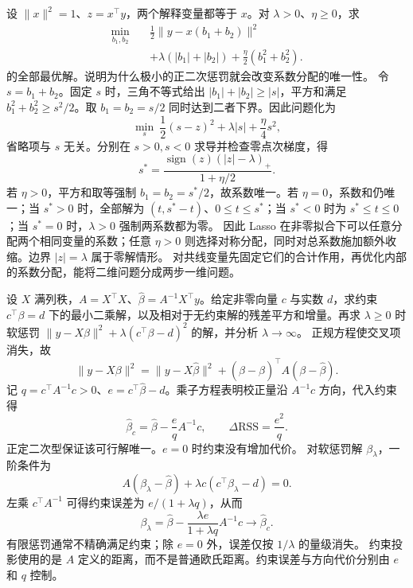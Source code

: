 设 $\|x\|^2=1$、$z=x^\top y$，两个解释变量都等于 $x$。对 $\lambda>0$、$\eta\ge0$，求
\[
 \begin{aligned}
 \min_{b_1,b_2}\quad&\frac12\|y-x(b_1+b_2)\|^2\\
 &+\lambda(|b_1|+|b_2|)+\frac\eta2(b_1^2+b_2^2).
 \end{aligned}
\]
的全部最优解。说明为什么极小的正二次惩罚就会改变系数分配的唯一性。
\solution 令 $s=b_1+b_2$。固定 $s$ 时，三角不等式给出 $|b_1|+|b_2|\ge|s|$，平方和满足 $b_1^2+b_2^2\ge s^2/2$。取 $b_1=b_2=s/2$ 同时达到二者下界。因此问题化为
\[
 \min_s\ \frac12(s-z)^2+\lambda|s|+\frac\eta4s^2,
\]
省略项与 $s$ 无关。分别在 $s>0,s<0$ 求导并检查零点次梯度，得
\[
 s^*=\frac{\operatorname{sign}(z)(|z|-\lambda)_+}{1+\eta/2}.
\]
若 $\eta>0$，平方和取等强制 $b_1=b_2=s^*/2$，故系数唯一。若 $\eta=0$，系数和仍唯一；当 $s^*>0$ 时，全部解为 $(t,s^*-t)$、$0\le t\le s^*$；当 $s^*<0$ 时为 $s^*\le t\le0$；当 $s^*=0$ 时，$\lambda>0$ 强制两系数都为零。
因此 Lasso 在非零拟合下可以任意分配两个相同变量的系数；任意 $\eta>0$ 则选择对称分配，同时对总系数施加额外收缩。边界 $|z|=\lambda$ 属于零解情形。
\insight 对共线变量先固定它们的合计作用，再优化内部的系数分配，能将二维问题分成两步一维问题。

设 $X$ 满列秩，$A=X^\top X$、$\widehat\beta=A^{-1}X^\top y$。给定非零向量 $c$ 与实数 $d$，求约束 $c^\top\beta=d$ 下的最小二乘解，以及相对于无约束解的残差平方和增量。再求 $\lambda\ge0$ 时软惩罚 $\|y-X\beta\|^2+\lambda(c^\top\beta-d)^2$ 的解，并分析 $\lambda\to\infty$。
\solution 正规方程使交叉项消失，故
\[
 \|y-X\beta\|^2=\|y-X\widehat\beta\|^2
 +(\beta-\widehat\beta)^\top A(\beta-\widehat\beta).
\]
记 $q=c^\top A^{-1}c>0$、$e=c^\top\widehat\beta-d$。乘子方程表明校正量沿 $A^{-1}c$ 方向，代入约束得
\[
 \boxed{\widehat\beta_c=\widehat\beta-\frac e q A^{-1}c},
 \qquad \Delta\mathrm{RSS}=\frac{e^2}{q}.
\]
正定二次型保证该可行解唯一。$e=0$ 时约束没有增加代价。
对软惩罚解 $\beta_\lambda$，一阶条件为
\[
 A(\beta_\lambda-\widehat\beta)
 +\lambda c(c^\top\beta_\lambda-d)=0.
\]
左乘 $c^\top A^{-1}$ 可得约束误差为 $e/(1+\lambda q)$，从而
\[
 \beta_\lambda=\widehat\beta-
 \frac{\lambda e}{1+\lambda q}A^{-1}c
 \longrightarrow\widehat\beta_c.
\]
有限惩罚通常不精确满足约束；除 $e=0$ 外，误差仅按 $1/\lambda$ 的量级消失。
\insight 约束投影使用的是 $A$ 定义的距离，而不是普通欧氏距离。约束误差与方向代价分别由 $e$ 和 $q$ 控制。



\par{}
